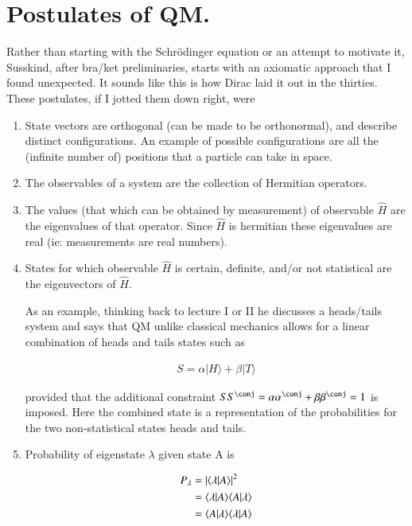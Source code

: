 \documentclass{article}
\newcommand{\ket}[1]{\lvert {#1} \rangle}
\newcommand{\braket}[2]{\langle{#1} \vert {#2}\rangle}
\newcommand{\hatH}[0]{\hat{H}}
\begin{document}
\section{ Postulates of QM. }

Rather than starting with the Schr\"{o}dinger equation or an attempt to motivate it, Susskind, after bra/ket preliminaries, starts with an axiomatic approach that I found unexpected.  It sounds like this is how Dirac laid it out in the thirties.  These postulates, if I jotted them down right, were

\begin{enumerate}

\item State vectors are orthogonal (can be made to be orthonormal), and describe distinct configurations.  An example of possible configurations are all the (infinite number of) positions that a particle can take in space.

\item The observables of a system are the collection of Hermitian operators.

\item The values (that which can be obtained by measurement) of observable $\hatH$ are the eigenvalues of that operator.  Since $\hatH$ is
hermitian these eigenvalues are real (ie: measurements are real numbers).

\item States for which observable $\hatH$ is certain, definite, and/or not statistical are the eigenvectors of $\hatH$.

As an example, thinking back to lecture I or II he discusses a heads/tails system and says that QM unlike classical mechanics allows for
a linear combination of heads and tails states such as

\begin{align*}
S = \alpha \ket{H} + \beta \ket{T}
\end{align*}

provided that the additional constraint $S S^\conj = \alpha{\alpha}^\conj + \beta{\beta}^\conj = 1$ is imposed.  Here the combined state is a representation
of the probabilities for the two non-statistical states heads and tails.

\item Probability of eigenstate $\lambda$ given state A is

\begin{align*}
P_{\lambda}
&= \Abs{\braket{\lambda}{A}}^2 \\
&= {\braket{\lambda}{A}} {\braket{A}{\lambda}} \\
&= \braket{A}{\lambda}\braket{\lambda}{A}
\end{align*}

\end{enumerate}
\end{document}
